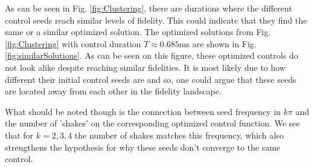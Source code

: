 \documentclass[a4paper, twocolumn]{revtex4-1}
\begin{document}
As can be seen in Fig. \ref{fig:Clustering}, there are durations where the different control seeds reach similar levels of fidelity. This could indicate that they find the same or a similar optimized solution. The optimized solutions from Fig. \ref{fig:Clustering} with control duration $T\approx 0.685$ms are shown in Fig. \ref{fig:similarSolutions}. As can be seen on this figure, these optimized controls do not look alike despite reaching similar fidelities. It is most likely due to how different their initial control seeds are and so, one could argue that these seeds are located away from each other in the fidelity landscape. %

What should be noted though is the connection between seed frequency in $k\pi$ and the number of 'shakes' on the corresponding optimized control function. We see that for $k=2,3,4$ the number of shakes matches this frequency, which also strengthens the hypothesis for why these seeds don't converge to the same control. \\
\end{document}
